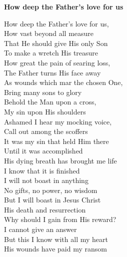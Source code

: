 \textbf{How deep the Father's love for us}

How deep the Father's love for us, \\
How vast beyond all measure \\
That He should give His only Son \\
To make a wretch His treasure \\

How great the pain of searing loss, \\
The Father turns His face away \\
As wounds which mar the chosen One, \\
Bring many sons to glory \\

Behold the Man upon a cross, \\
My sin upon His shoulders \\
Ashamed I hear my mocking voice, \\
Call out among the scoffers \\ 

It was my sin that held Him there \\
Until it was accomplished \\
His dying breath has brought me life \\
I know that it is finished \\

I will not boast in anything \\
No gifts, no power, no wisdom \\
But I will boast in Jesus Christ \\
His death and resurrection \\

Why should I gain from His reward? \\
I cannot give an answer \\
But this I know with all my heart \\
His wounds have paid my ransom \\
